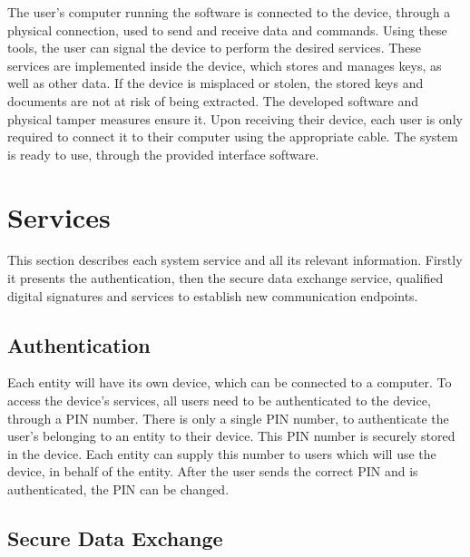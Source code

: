 The user's computer running the software is connected to the device, through a physical connection, used to send and receive data and commands.
Using these tools, the user can signal the device to perform the desired services.
These services are implemented inside the device, which stores and manages keys, as well as other data.
If the device is misplaced or stolen, the stored keys and documents are not at risk of being extracted. The developed software and physical tamper measures ensure it.
Upon receiving their device, each user is only required to connect it to their computer using the appropriate cable. The system is ready to use, through the provided interface software.

\section{Services}\label{chap:arch:services}

This section describes each system service and all its relevant information. 
Firstly it presents the authentication, then the secure data exchange service, qualified digital signatures and services to establish new communication endpoints.

\subsection{Authentication}\label{chap:arch:services:auth}

Each entity will have its own device, which can be connected to a computer. To access the device's services, all users need to be authenticated to the device, through a PIN number. There is only a single PIN number, to authenticate the user's belonging to an entity to their device. This PIN number is securely stored in the device.
Each entity can supply this number to users which will use the device, in behalf of the entity.
After the user sends the correct PIN and is authenticated, the PIN can be changed.

\subsection{Secure Data Exchange}\label{chap:arch:services:data-exchange}

